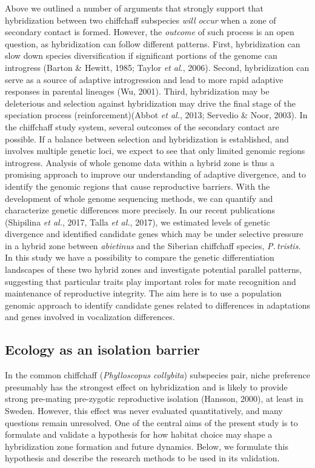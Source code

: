 \documentclass[11pt,a4paper]{article}
\begin{document}
Above we outlined a number of arguments that strongly support that hybridization between two chiffchaff subspecies \textit{will occur} when a zone of secondary contact is formed. However, the \textit{outcome} of such process is an open question, as hybridization can follow different patterns. First, hybridization can slow down species diversification if significant portions of the genome can introgress (Barton \& Hewitt, 1985; Taylor \textit{et al.}, 2006). Second, hybridization can serve as a source of adaptive introgression and lead to more rapid adaptive responses in parental lineages (Wu, 2001). Third, hybridization may be deleterious and selection against hybridization may drive the final stage of the speciation process (reinforcement)(Abbot \textit{et al.}, 2013; Servedio \& Noor, 2003). In the chiffchaff study system, several outcomes of the secondary contact are possible. If a balance between selection and hybridization is established, and involves multiple genetic loci, we expect to see that only limited genomic regions introgress. Analysis of whole genome data within a hybrid zone is thus a promising approach to improve our understanding of adaptive divergence, and to identify the genomic regions that cause reproductive barriers. With the development of whole genome sequencing methods, we can quantify and characterize genetic differences more precisely. In our recent publications (Shipilina \textit{et al.}, 2017, Talla \textit{et al.}, 2017), we estimated levels of genetic divergence and identified candidate genes which may be under selective pressure in a hybrid zone between \textit{abietinus} and the Siberian chiffchaff species, \textit{P.\,tristis}. In this study we have a possibility to compare the genetic differentiation landscapes of these two hybrid zones and investigate potential parallel patterns, suggesting that particular traits play important roles for mate recognition and maintenance of reproductive integrity. The aim here is to use a population genomic approach to identify candidate genes related to differences in adaptations and genes involved in vocalization differences.

\subsection{Ecology as an isolation barrier }

In the common chiffchaff (\textit{Phylloscopus collybita}) subspecies pair, niche preference presumably has the strongest effect on hybridization and is likely to provide strong pre-mating pre-zygotic reproductive isolation (Hansson, 2000), at least in Sweden. However, this effect was never evaluated quantitatively, and many questions remain unresolved. One of the central aims of the present study is to formulate and validate a hypothesis for how habitat choice may shape a hybridization zone formation and future dynamics. Below, we formulate this hypothesis and describe the research methods to be used in its validation. 
\end{document}

